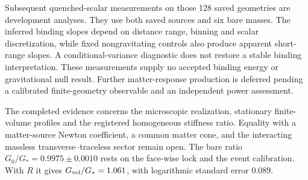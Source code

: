 Subsequent quenched-scalar measurements on those 128 saved geometries
are development analyses. They use both saved sources and six bare
masses. The inferred binding slopes depend on distance range, binning
and scalar discretization, while fixed nongravitating controls also
produce apparent short-range slopes. A conditional-variance diagnostic
does not restore a stable binding interpretation. These measurements
supply no accepted binding energy or gravitational null result.
Further matter-response production is deferred pending a calibrated
finite-geometry observable and an independent power assessment.

The completed evidence concerns the microscopic realization, stationary
finite-volume profiles and the registered homogeneous stiffness ratio.
Equality with a matter-source Newton coefficient, a common matter cone,
and the interacting massless transverse--traceless sector remain open.
The bare ratio $G_0/G_*=0.9975\pm0.0010$ rests on the face-wise lock and the event calibration. With $R$ it gives $G_{\rm vol}/G_*=1.061$, with logarithmic standard error $0.089$.
